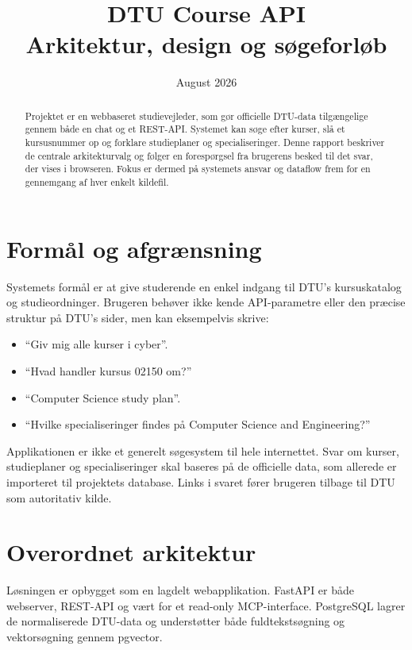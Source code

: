 \documentclass[11pt,a4paper]{article}
\title{DTU Course API\\[0.3em]
\large Arkitektur, design og søgeforløb}
\author{}
\date{August 2026}
\begin{document}
\maketitle

\begin{abstract}
Projektet er en webbaseret studievejleder, som gør officielle DTU-data
tilgængelige gennem både en chat og et REST-API. Systemet kan søge efter
kurser, slå et kursusnummer op og forklare studieplaner og specialiseringer.
Denne rapport beskriver de centrale arkitekturvalg og følger en forespørgsel
fra brugerens besked til det svar, der vises i browseren. Fokus er dermed på
systemets ansvar og dataflow frem for en gennemgang af hver enkelt kildefil.
\end{abstract}

\tableofcontents

\section{Formål og afgrænsning}

Systemets formål er at give studerende en enkel indgang til DTU's
kursuskatalog og studieordninger. Brugeren behøver ikke kende API-parametre
eller den præcise struktur på DTU's sider, men kan eksempelvis skrive:

\begin{itemize}
  \item ``Giv mig alle kurser i cyber''.
  \item ``Hvad handler kursus 02150 om?''
  \item ``Computer Science study plan''.
  \item ``Hvilke specialiseringer findes på Computer Science and Engineering?''
\end{itemize}

Applikationen er ikke et generelt søgesystem til hele internettet. Svar om
kurser, studieplaner og specialiseringer skal baseres på de officielle data,
som allerede er importeret til projektets database. Links i svaret fører
brugeren tilbage til DTU som autoritativ kilde.

\section{Overordnet arkitektur}

Løsningen er opbygget som en lagdelt webapplikation. FastAPI er både
webserver, REST-API og vært for et read-only MCP-interface. PostgreSQL lagrer
de normaliserede DTU-data og understøtter både fuldtekstsøgning og
vektorsøgning gennem pgvector.
\end{document}
